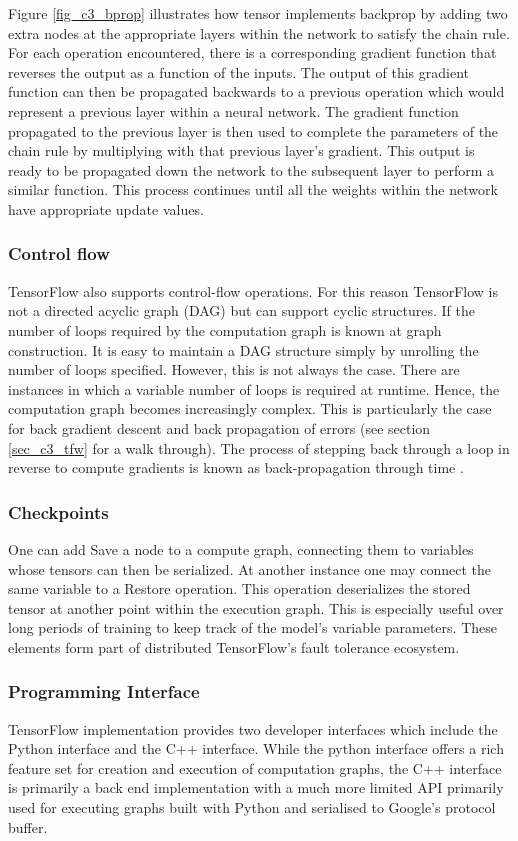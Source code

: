 Figure \ref{fig_c3_bprop} illustrates how tensor implements backprop by adding two extra nodes at the appropriate layers within the network to satisfy the chain rule.  For each operation encountered, there is a corresponding gradient function that reverses the output as a function of the inputs.  The output of this gradient function can then be propagated backwards to a previous operation which would represent a previous layer within a neural network.  The gradient function propagated to the previous layer is then used to complete the parameters of the chain rule by multiplying with that previous layer’s gradient.  This output is ready to be propagated down the network to the subsequent layer to perform a similar function.  This process continues until all the weights within the network have appropriate update values.

\subsubsection{Control flow}
TensorFlow also supports control-flow operations.  For this reason TensorFlow is not a directed acyclic graph (DAG) but can support cyclic structures. If the number of loops required by the computation graph is known at graph construction.  It is easy to maintain a DAG structure simply by unrolling the number of loops specified.  However, this is not always the case.  There are instances in which a variable number of loops is required at runtime.  Hence, the computation graph becomes increasingly complex.  This is particularly the case for back gradient descent and back propagation of errors (see section \ref{sec_c3_tfw} for a  walk through).  The process of stepping back through a loop in reverse to compute gradients is known as back-propagation through time \citep{al2016theano}.

\subsubsection{Checkpoints}
One can add Save a node to a compute graph, connecting them to variables whose tensors can then be serialized. At another instance one may connect the same variable to a Restore operation. This operation deserializes the stored tensor at another point within the execution graph. This is especially useful over long periods of training to keep track of the model’s variable parameters. These elements form part of distributed TensorFlow's fault tolerance ecosystem.

\subsubsection{Programming Interface}
TensorFlow implementation provides two developer interfaces which include the Python interface and the C++ interface.  While the python interface offers a rich feature set for creation and execution of computation graphs, the C++ interface is primarily a back end implementation with a much more limited API primarily used for executing graphs built with Python and serialised to Google’s protocol buffer.

